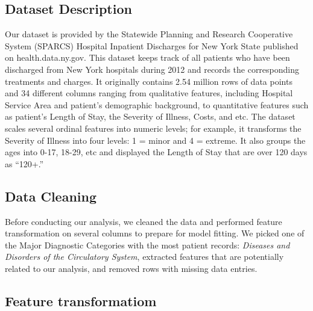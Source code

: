 \documentclass[12pt]{article}
\begin{document}
\subsection{Dataset Description} 
Our dataset is provided by the Statewide Planning and Research Cooperative System (SPARCS) Hospital Inpatient Discharges for New York State published on health.data.ny.gov. This dataset keeps track of all patients who have been discharged from New York hospitals during 2012 and records the corresponding treatments and charges. \bigskip
\newline It originally contains 2.54 million rows of data points and 34 different columns ranging from qualitative features, including Hospital Service Area and patient’s demographic background, to quantitative features such as patient’s Length of Stay, the Severity of Illness, Costs, and etc. The dataset scales several ordinal features into numeric levels; for example, it transforms the Severity of Illness into four levels: 1 = minor and 4 = extreme. It also groups the ages into 0-17, 18-29, etc and displayed the Length of Stay that are over 120 days as “120+.”

\subsection{Data Cleaning}
Before conducting our analysis, we cleaned the data and performed feature transformation on several columns to prepare for model fitting. We picked one of the Major Diagnostic Categories with the most patient records: \textit{Diseases and Disorders of the Circulatory System}, extracted features that are potentially related to our analysis, and removed rows with missing data entries. 

\subsection{Feature transformatiom}
\end{document}
